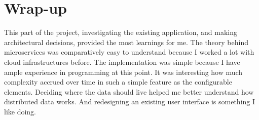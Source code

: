 \section{Wrap-up}

This part of the project, investigating the existing application, and making architectural decisions, provided the most learnings for me. The theory behind microservices was comparatively easy to understand because I worked a lot with cloud infrastructures before. The implementation was simple because I have ample experience in programming at this point. It was interesting how much complexity accrued over time in such a simple feature as the configurable elements. Deciding where the data should live helped me better understand how distributed data works. And redesigning an existing user interface is something I like doing.


